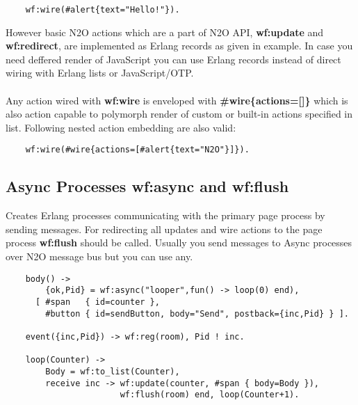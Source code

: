 \vspace{1\baselineskip}
\begin{lstlisting}
    wf:wire(#alert{text="Hello!"}).
\end{lstlisting}
\vspace{1\baselineskip}

However basic N2O actions which are a part of N2O API, {\bf wf:update} and {\bf wf:redirect},
are implemented as Erlang records as given in example. In case you need deffered
render of JavaScript you can use Erlang records instead of direct wiring with
Erlang lists or JavaScript/OTP.

\paragraph{}
Any action wired with {\bf wf:wire} is enveloped with {\bf \#wire\{actions=[]\}}
which is also action capable to polymorph render of custom or built-in actions specified in list.
Following nested action embedding are also valid:

\vspace{1\baselineskip}
\begin{lstlisting}
    wf:wire(#wire{actions=[#alert{text="N2O"}]}).
\end{lstlisting}
\vspace{1\baselineskip}

\subsection{Async Processes {\bf wf:async} and {\bf wf:flush}}
Creates Erlang processes communicating with the primary page
process by sending messages. For redirecting all updates and
wire actions to the page process {\bf wf:flush} should be called.
Usually you send messages to Async processes over N2O
message bus but you can use any.

\vspace{1\baselineskip}
\begin{lstlisting}
    body() ->
        {ok,Pid} = wf:async("looper",fun() -> loop(0) end),
      [ #span   { id=counter },
        #button { id=sendButton, body="Send", postback={inc,Pid} } ].

    event({inc,Pid}) -> wf:reg(room), Pid ! inc.

    loop(Counter) ->
        Body = wf:to_list(Counter),
        receive inc -> wf:update(counter, #span { body=Body }),
                       wf:flush(room) end, loop(Counter+1).
\end{lstlisting}

